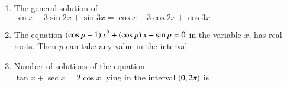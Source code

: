 \documentclass[journal,12pt,twocolumn]{IEEEtran}
\theoremstyle{remark}
\begin{document}
\begin{enumerate}
    \item The general solution of \\$\sin{x}-3\sin{2x} + \sin{3x} = \cos{x}-3\cos{2x} + \cos{3x}$
        
        \begin{enumerate}[label={(\alph*)}]
        \end{enumerate}


    \item The equation $\left(\cos{p}-1\right)x^2+\left(\cos{p}\right)x+\sin{p}=0$ in the variable $x$, has real roots. Then $p$ can take any value in the interval
        
        \begin{enumerate}[label={(\alph*)}]

        \end{enumerate}

    \item Number of solutions of the equation \\$\tan{x}+\sec{x} = 2\cos{x}$ lying in the interval $\left(0, 2\pi\right)$ is
        

\end{enumerate}
\end{document}
